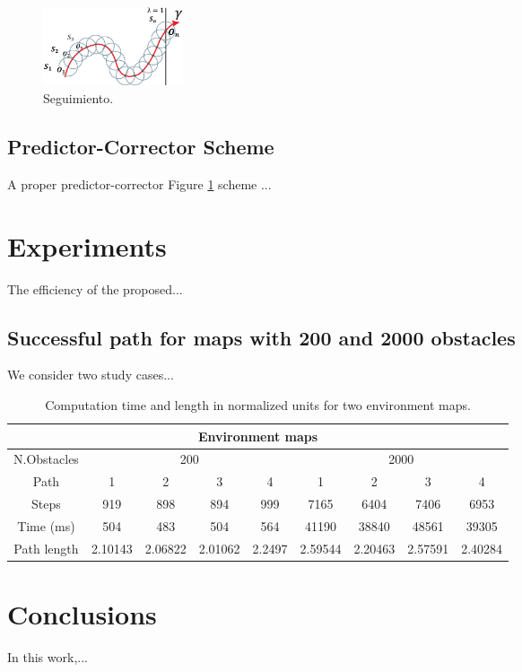 \documentclass[conference]{IEEEtran}
\begin{document}
\begin{figure}[H]
\begin{center}
\includegraphics[width=0.2\textwidth]{imagenes/hiper2.eps} 
\caption{ Seguimiento.}
\label{fig:hiper4}
\end{center}
\end{figure}    
  
\subsection*{Predictor-Corrector Scheme}
 A proper \cite{plc1} predictor-corrector Figure \ref{fig:hiper4} scheme \cite{Hector1, Gerardo1}...
  
 
 



\section{Experiments}

The efficiency of the \cite{Park-2008} proposed...
\subsection{Successful path for maps with 200 and 2000 obstacles}

We consider two study cases...

  \vspace{-0.1 cm}
\begin{table}[H]
\begin{center}
\resizebox{9cm}{!} {
\begin{tabular}{ |c|c|c|c|c|c|c|c|c| }
\hline
\multicolumn{9}{|c|}{Environment maps}\\
\hline
\multicolumn{1}{|c}{N.Obstacles}&\multicolumn{4}{|c}{200}&\multicolumn{4}{|c|}{2000}\\
\hline
Path&1&2&3&4&1&2&3&4\\
\hline
Steps&919&898&894&999&7165&6404&7406&6953\\
\hline
Time (ms)&504&483 &504&564&41190&38840&48561&39305\\
\hline
Path length&2.10143&2.06822&2.01062&2.2497&2.59544&2.20463&2.57591&2.40284\\
\hline
\end{tabular}
}
\end{center}
\caption{Computation time and length in normalized units for two environment maps.}
\label{table:tiempos}
\end{table}


\section{Conclusions}
 In this work,...



\end{document}
